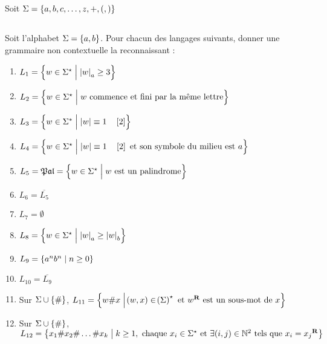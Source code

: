 \documentclass[a4paper,french,bookmarks]{book}
\begin{document}
    \subsection{}
    
    Soit $\Sigma = \left\{a, b, c, \dots, z, +, (, )\right\}$
    
    \subsection{}
    
    Soit l'alphabet $\Sigma = \left\{a, b\right\}$. Pour chacun des langages suivants, donner une grammaire non contextuelle la reconnaissant :
    
    \begin{enumerate}
        \item $L_1 = \ens{w \in \Sigma^\star \benstq \mod{w}_a \geq 3}$
        
        \item $L_2 = \ens{w \in \Sigma^\star \benstq w \ \text{commence et fini par la même lettre}}$
        
        \item $L_3 = \ens{w \in \Sigma^* \benstq \mod{w} \equiv 1 \quad \intc{2}}$
        
        \item $L_4 = \ens{w \in \Sigma^\star \benstq \mod{w} \equiv 1 \quad \intc{2} \et \text{son symbole du milieu est} \ a}$
        
        \item $L_5 = \mathfrak{Pal} = \ens{w \in \Sigma^\star \benstq w \ \text{est un palindrome}}$
        
        \item $L_6 = \overline{L_5}$ 
        
        \item $L_7 = \emptyset$
        
        \item $L_8 = \ens{w \in \Sigma^\star \benstq \mod{w}_a \geq \mod{w}_b}$
        
        \item $L_9 = \left\{a^nb^n \;\middle\vert\; n \geq 0\right\}$
        
        \item $L_{10} = \overline{L_9}$
        
        \item Sur $\Sigma \cup \left\{\#\right\}$, $L_{11} = \ens{w\# x \benstq \p{w, x} \in \p{\Sigma}^\star \et w^\bbR \ \text{est un sous-mot de} \ x}$
        
        \item Sur $\Sigma \cup \left\{\#\right\}$, $L_{12} = \left\{x_1 \# x_2 \# \dots \# x_k \;\middle\vert\; k \geq 1, \ \text{chaque} \ x_i \in \Sigma^\star \ \text{et} \  \exists \!\left(i, j\right) \in \mathbb{N}^2 \ \text{tels que} \ x_i = {x_j}^{\mathbf{R}}\right\}$
    \end{enumerate}
    
\end{document}
